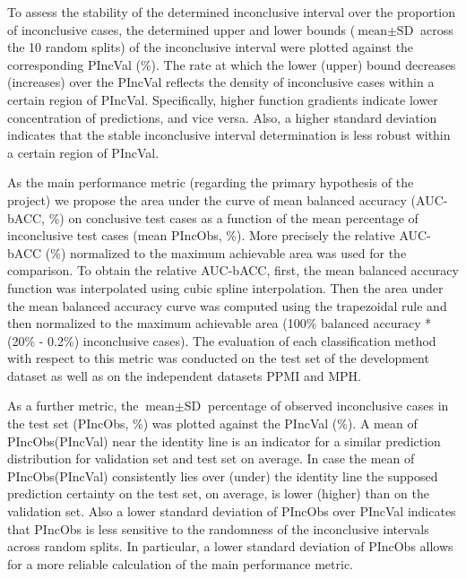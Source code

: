 To assess the stability of the determined inconclusive interval over the proportion of inconclusive cases,
the determined upper and lower bounds ($\text{mean} \pm \text{SD}$ across the 10 random splits) 
of the inconclusive interval were plotted against the corresponding PIncVal (\%).
The rate at which the lower (upper) bound decreases (increases) over the PIncVal 
reflects the density of inconclusive cases within a certain region of PIncVal.
Specifically, higher function gradients indicate lower concentration of predictions, 
and vice versa.
Also, a higher standard deviation indicates that the stable inconclusive interval determination 
is less robust within a certain region of PIncVal.


As the main performance metric (regarding the primary hypothesis of the project) 
we propose the area under the curve of mean balanced accuracy (AUC-bACC, \%) on conclusive test cases 
as a function of the mean percentage of inconclusive test cases (mean PIncObs, \%).
More precisely the relative AUC-bACC (\%) normalized to the maximum achievable area was used for the comparison.
To obtain the relative AUC-bACC, 
first, the mean balanced accuracy function was interpolated using cubic spline interpolation.
Then the area under the mean balanced accuracy curve was computed using the trapezoidal rule 
and then normalized to the maximum achievable area (100\% balanced accuracy * (20\% - 0.2\%) inconclusive cases).
The evaluation of each classification method with respect to this metric was conducted on the test set of the 
development dataset as well as on the independent datasets PPMI and MPH.

As a further metric, the $\text{mean} \pm \text{SD}$ percentage of observed inconclusive cases in the test set (PIncObs, \%) 
was plotted against the PIncVal (\%).
A mean of PIncObs(PIncVal) near the identity line is an indicator for a similar prediction distribution 
for validation set and test set on average.
In case the mean of PIncObs(PIncVal) consistently lies over (under) the identity line 
the supposed prediction certainty on the test set, on average, is lower (higher) than on the validation set.
Also a lower standard deviation of PIncObs over PIncVal indicates 
that PIncObs is less sensitive to the randomness of the inconclusive intervals across random splits.
In particular, a lower standard deviation of PIncObs allows for a more reliable calculation of the main performance metric.
